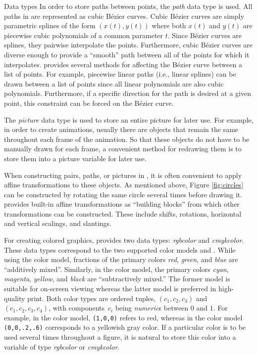 \begin{section}{Data types}
In order to store paths between points, the \textit{path} data type is
used.  All paths in \MP{} are represented as cubic B\'{e}zier curves.
Cubic B\'{e}zier curves are simply parametric splines of the form
$(x(t),y(t))$ where both $x(t)$ and $y(t)$ are piecewise cubic
polynomials of a common parameter $t$.  Since B\'{e}zier curves are
splines, they pairwise interpolate the points.  Furthermore, cubic
B\'{e}zier curves are diverse enough to provide a ``smooth'' path
between all of the points for which it interpolates.  \MP{} provides
several methods for affecting the B\'{e}zier curve between a list of
points.  For example, piecewise linear paths (i.e., linear splines) can
be drawn between a list of points since all linear polynomials are also
cubic polynomials.  Furthermore, if a specific direction for the path is
desired at a given point, this constraint can be forced on the
B\'{e}zier curve.

The \textit{picture} data type is used to store an entire picture for
later use.  For example, in order to create animations, usually there
are objects that remain the same throughout each frame of the animation.
So that these objects do not have to be manually drawn for each frame, a
convenient method for redrawing them is to store them into a picture
variable for later use.

When constructing pairs, paths, or pictures in \MP{}, it is often
convenient to apply affine transformations to these objects.  As
mentioned above, Figure \ref{fig:circles} can be constructed by rotating
the same circle several times before drawing it.  \MP{} provides
built-in affine transformations as ``building blocks'' from which other
transformations can be constructed.  These include shifts, rotations,
horizontal and vertical scalings, and slantings.

For creating colored graphics, \MP{} provides two data types:
\textit{rgbcolor} and \textit{cmykcolor}.  These data types correspond to the two
supported color models \RGB{} and \CMYK.  While using the \RGB{} color model,
fractions of the primary colors \textit{red}, \textit{green}, and
\textit{blue} are ``additively mixed''.  Similarly, in the \CMYK{} color model, the primary
colors \textit{cyan}, \textit{magenta}, \textit{yellow}, and
\textit{black} are ``subtractively mixed.''  The former model is
suitable for on-screen viewing whereas the latter model is preferred in
high-quality print.  Both color types are ordered tuples,
$(c_1,c_2,c_3)$ and $(c_1,c_2,c_3,c_4)$, with components~$c_i$ being
\textit{numeric}s between $0$ and $1$.  For example, in the \RGB{} color
model, \texttt{(1,0,0)} refers to red, whereas in the \CMYK{} color model
\texttt{(0,0,.2,.6)} corresponds to a yellowish gray color.  If a
particular color is to be used several times throughout a figure, it is
natural to store this color into a variable of type \textit{rgbcolor} or
\textit{cmykcolor}.


\end{section}
